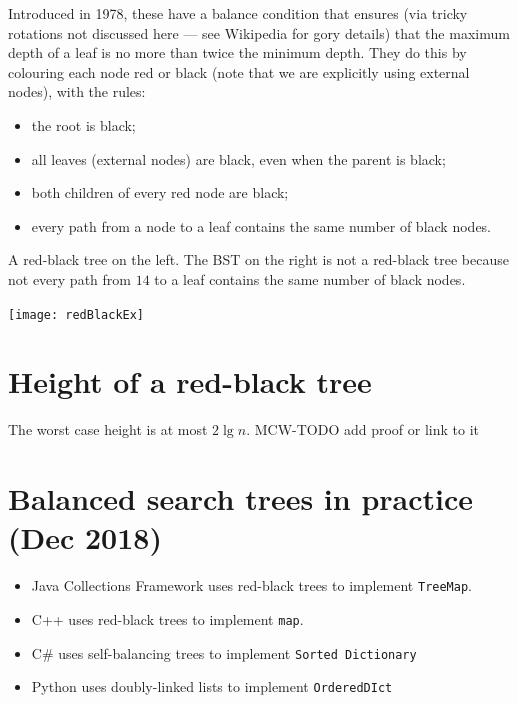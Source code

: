 Introduced in 1978, these have a balance condition that ensures (via tricky rotations not discussed here --- see Wikipedia for gory details) 
that the maximum depth of a leaf is no more than twice the minimum depth. 
They do this by colouring each node red or black (note that we are explicitly using external nodes), with the rules:
\begin{itemize}
\item the root is black;
\item all leaves (external nodes) are black, even when the parent is black;
\item both children of every red node are black;
\item every path from a node to a leaf contains the same number of black nodes.
\end{itemize}

\begin{Boxample} \label{ex:redblackTreeEx}
A red-black tree on the left. The BST on the right is not a red-black tree 
  because not every path from $14$ to a leaf contains the same number of black nodes.
\begin{center}
  \texttt{[image: redBlackEx]}
\end{center}
\end{Boxample}

\section*{Height of a red-black tree}
The worst case height is at most $2 \lg n$.
MCW-TODO add proof or link to it

\section*{Balanced search trees in practice (Dec 2018)}
\begin{itemize}
\item Java Collections Framework uses red-black trees to implement \texttt{TreeMap}.
\item C++  uses red-black trees to implement \texttt{map}.
\item C\# uses self-balancing trees to implement \texttt{Sorted Dictionary}
\item Python uses doubly-linked lists to implement \texttt{OrderedDIct}
\end{itemize}




